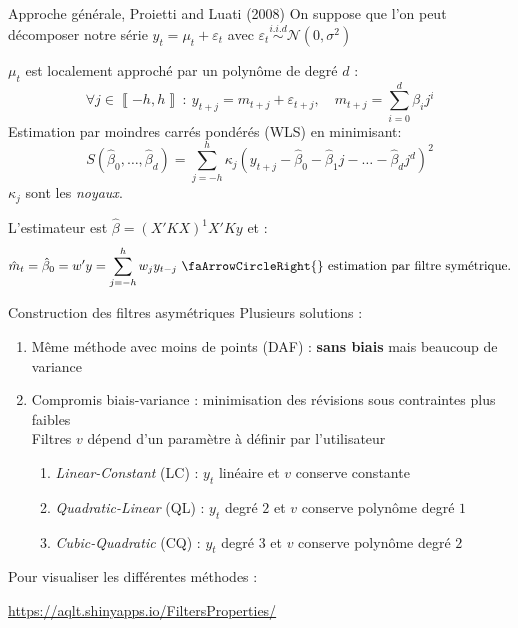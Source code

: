 \documentclass[10pt,xcolor=table,color={dvipsnames,usenames},ignorenonframetext,usepdftitle=false,french]{beamer}
\providecommand{\tightlist}{%
  \setlength{\parskip}{0pt}
  }
\newcommand\1{\mathds{1}}
\begin{document}
\begin{frame}{Approche générale, Proietti and Luati (2008)}
\protect\hypertarget{approche-guxe9nuxe9rale-proietti-and-luati-2008}{}
On suppose que l'on peut décomposer notre série
\(y_t=\mu_t+\varepsilon_t\) avec
\(\varepsilon_t\overset{i.i.d}{\sim}\mathcal N(0,\sigma^2)\)

\(\mu_t\) est localement approché par un polynôme de degré \(d\) : \[
\forall j\in\left\llbracket -h,h\right\rrbracket \::\: y_{t+j}=m_{t+j}+\varepsilon_{t+j},\quad m_{t+j}=\sum_{i=0}^{d}\beta_{i}j^{i}
\] \pause Estimation par moindres carrés pondérés (WLS) en minimisant:
\[
S(\hat{\beta}_{0},\dots,\hat{\beta}_{d})=\sum_{j=-h}^{h}\kappa_{j}(y_{t+j}-\hat{\beta}_{0}-\hat{\beta}_{1}j-\dots-\hat{\beta}_{d}j^{d})^{2}
\] \(\kappa_j\) sont les \emph{noyaux}.

\pause

L'estimateur est \(\hat{\beta}=(X'KX)^{1}X'Ky\) et : \[
\hat{m}_{t}=\hat\beta_0=w'y=\sum_{j=-h}^{h}w_{j}y_{t-j}
\text{ \faArrowCircleRight{} estimation par filtre symétrique.}
\]
\end{frame}

\begin{frame}{Construction des filtres asymétriques}
\protect\hypertarget{construction-des-filtres-asymuxe9triques}{}
Plusieurs solutions :

\begin{enumerate}
\tightlist
\item
  Même méthode avec moins de points (DAF) : \textbf{sans biais} mais
  beaucoup de variance
\end{enumerate}

\pause

\begin{enumerate}
\setcounter{enumi}{1}
\item
  Compromis biais-variance : minimisation des révisions sous contraintes
  plus faibles\\
  Filtres \(v\) dépend d'un paramètre à définir par l'utilisateur

  \begin{enumerate}
  \item
    \emph{Linear-Constant} (LC) : \(y_t\) linéaire et \(v\) conserve
    constante
  \item
    \emph{Quadratic-Linear} (QL) : \(y_t\) degré \(2\) et \(v\) conserve
    polynôme degré \(1\)
  \item
    \emph{Cubic-Quadratic} (CQ) : \(y_t\) degré \(3\) et \(v\) conserve
    polynôme degré \(2\)
  \end{enumerate}
\end{enumerate}

\pause

\faDesktop{} Pour visualiser les différentes méthodes :

\url{https://aqlt.shinyapps.io/FiltersProperties/}
\end{frame}
\end{document}
